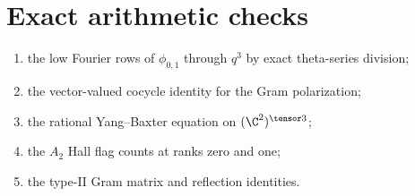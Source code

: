 \chapter{Exact arithmetic checks}
%
\begin{enumerate}
\item the low Fourier rows of $\phi_{0,1}$ through $q^3$ by exact theta-series division;
\item the vector-valued cocycle identity for the Gram polarization;
\item the rational Yang--Baxter equation on $(\C^2)^{\tensor3}$;
\item the $A_2$ Hall flag counts at ranks zero and one;
\item the type-II Gram matrix and reflection identities.
\end{enumerate}
%
